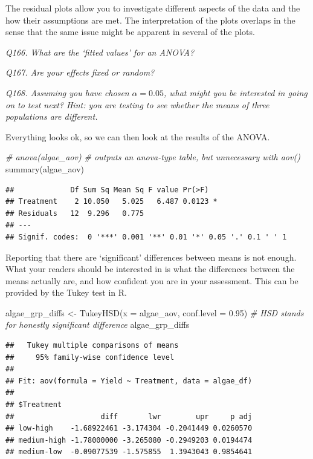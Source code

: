 \documentclass[
  11pt,
  a4paper,
]{book}
\newenvironment{Shaded}{\begin{snugshade}}{\end{snugshade}}
\newcommand{\AttributeTok}[1]{\textcolor[rgb]{0.77,0.63,0.00}{#1}}
\newcommand{\CommentTok}[1]{\textcolor[rgb]{0.56,0.35,0.01}{\textit{#1}}}
\newcommand{\FloatTok}[1]{\textcolor[rgb]{0.00,0.00,0.81}{#1}}
\newcommand{\FunctionTok}[1]{\textcolor[rgb]{0.00,0.00,0.00}{#1}}
\newcommand{\NormalTok}[1]{#1}
\newcommand{\OtherTok}[1]{\textcolor[rgb]{0.56,0.35,0.01}{#1}}
\begin{document}
The residual plots allow you to investigate different aspects of the data and the how their assumptions are met. The interpretation of the plots overlaps in the sense that the same issue might be apparent in several of the plots.

\emph{Q166. What are the `fitted values' for an ANOVA?}

\emph{Q167. Are your effects fixed or random?}

\emph{Q168. Assuming you have chosen} \(\alpha = 0.05\)\emph{, what might you be interested in going on to test next? Hint: you are testing to see whether the means of three populations are different.}

Everything looks ok, so we can then look at the results of the ANOVA.

\begin{Shaded}
\begin{Highlighting}[]
\CommentTok{\# anova(algae\_aov) \# outputs an anova{-}type table, but unnecessary with aov()}
\FunctionTok{summary}\NormalTok{(algae\_aov)}
\end{Highlighting}
\end{Shaded}

\begin{verbatim}
##             Df Sum Sq Mean Sq F value Pr(>F)  
## Treatment    2 10.050   5.025   6.487 0.0123 *
## Residuals   12  9.296   0.775                 
## ---
## Signif. codes:  0 '***' 0.001 '**' 0.01 '*' 0.05 '.' 0.1 ' ' 1
\end{verbatim}

Reporting that there are `significant' differences between means is not enough. What your readers should be interested in is what the differences between the means actually are, and how confident you are in your assessment. This can be provided by the Tukey test in R.

\begin{Shaded}
\begin{Highlighting}[]
\NormalTok{algae\_grp\_diffs }\OtherTok{\textless{}{-}} \FunctionTok{TukeyHSD}\NormalTok{(}\AttributeTok{x =}\NormalTok{ algae\_aov, }\AttributeTok{conf.level =} \FloatTok{0.95}\NormalTok{) }
\CommentTok{\# HSD stands for \textquotesingle{}honestly significant difference\textquotesingle{}}
\NormalTok{algae\_grp\_diffs}
\end{Highlighting}
\end{Shaded}

\begin{verbatim}
##   Tukey multiple comparisons of means
##     95% family-wise confidence level
## 
## Fit: aov(formula = Yield ~ Treatment, data = algae_df)
## 
## $Treatment
##                    diff       lwr        upr     p adj
## low-high    -1.68922461 -3.174304 -0.2041449 0.0260570
## medium-high -1.78000000 -3.265080 -0.2949203 0.0194474
## medium-low  -0.09077539 -1.575855  1.3943043 0.9854641
\end{verbatim}
\end{document}
